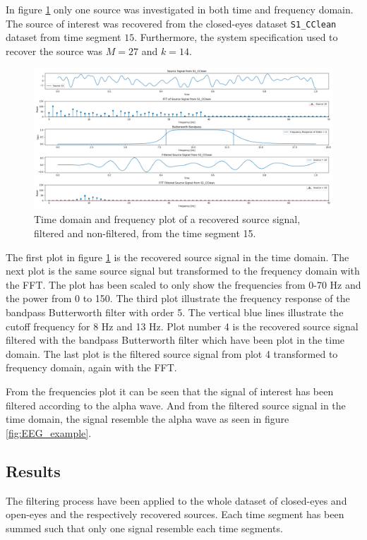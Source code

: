 In figure \ref{fig:dft_1} only one source was investigated in both time and frequency domain. The source of interest was recovered from the closed-eyes dataset \texttt{S1\_CClean} dataset from time segment $15$. Furthermore, the system specification used to recover the source was $M=27$ and $k=14$.
\begin{figure}[H]
\centering
\includegraphics[scale=0.28]{figures/ch_7/DFT_plot_X_timeseg15_source10.png}
\caption{Time domain and frequency plot of a recovered source signal, filtered and non-filtered, from the time segment 15.}
\label{fig:dft_1}
\end{figure}
\noindent
The first plot in figure \ref{fig:dft_1} is the recovered source signal in the time domain. The next plot is the same source signal but transformed to the frequency domain with the FFT. The plot has been scaled to only show the frequencies from 0-70 Hz and the power from 0 to 150. The third plot illustrate the frequency response of the bandpass Butterworth filter with order 5. The vertical blue lines illustrate the cutoff frequency for 8 Hz and 13 Hz.
Plot number 4 is the recovered source signal filtered with the bandpass Butterworth filter which have been plot in the time domain. The last plot is the filtered source signal from plot 4 transformed to frequency domain, again with the FFT.

From the frequencies plot it can be seen that the signal of interest has been filtered according to the alpha wave. And from the filtered source signal in the time domain, the signal resemble the alpha wave as seen in figure \ref{fig:EEG_example}.

\subsection{Results}
The filtering process have been applied to the whole dataset of closed-eyes and open-eyes and the respectively recovered sources. Each time segment has been summed such that only one signal resemble each time segments.

